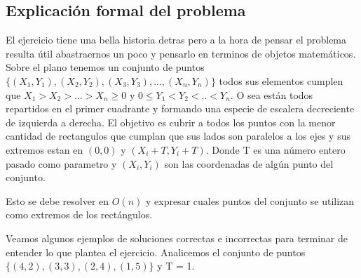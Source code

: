\subsection{Explicación formal del problema}

El ejercicio tiene una bella historia detras pero a la hora de pensar el problema resulta útil abastraernos un poco y pensarlo en terminos de objetos matemáticos. Sobre el plano tenemos un conjunto de puntos $ \{ (X_1,Y_1), (X_2,Y_2), (X_3,Y_3),..., (X_n,Y_n) \} $ todos sus elementos cumplen que $X_1 > X_2 > ... > X_n \geq 0 $ y $ 0 \leq Y_1 < Y_2 < .. < Y_n $. O sea están todos repartidos en el primer cuadrante y formando una especie de escalera decreciente de izquierda a derecha. El objetivo es cubrir a todos los puntos con la menor cantidad de rectangulos que cumplan que sus lados son paralelos a los ejes y sus extremos estan en $ (0,0) $ y $ (X_i + T, Y_i + T) $. Donde T es una número entero pasado como parametro y $(X_i,Y_i)$ son las coordenadas de algún punto del conjunto.

Esto se debe resolver en $ O(n)$ y expresar cuales puntos del conjunto se utilizan como extremos de los rectángulos.

Veamos algunos ejemplos de soluciones correctas e incorrectas para terminar de entender lo que plantea el ejercicio. Analicemos el conjunto de puntos $\{(4,2),(3,3),(2,4),(1,5)\}$ y T = 1.

